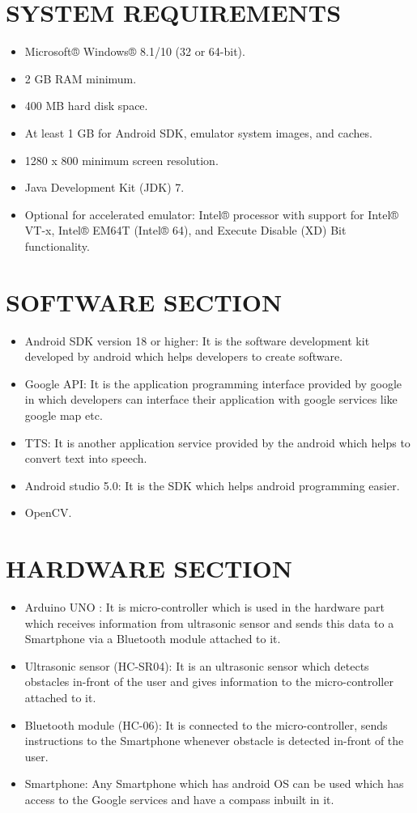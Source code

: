 \documentclass[10pt,a4paper,twoside]{report}
\begin{document}
\section{SYSTEM REQUIREMENTS}
\begin{itemize}
\item Microsoft® Windows® 8.1/10 (32 or 64-bit).
\item 2 GB RAM minimum.
\item 400 MB hard disk space.
\item At least 1 GB for Android SDK, emulator system images, and caches.
\item 1280 x 800 minimum screen resolution.
\item Java Development Kit (JDK) 7.
\item Optional for accelerated emulator: Intel® processor with support for Intel® VT-x, Intel® EM64T (Intel® 64), and Execute Disable (XD) Bit functionality.

\end{itemize}
\section{SOFTWARE SECTION}
\begin{itemize}
\item Android SDK version 18 or higher: It is the software development kit developed
by android which helps developers to create software.
\item Google API: It is the application programming interface provided by google in
which developers can interface their application with google services like google
map etc.
\item TTS: It is another application service provided by the android which helps to
convert text into speech.
\item Android studio 5.0: It is the SDK which helps android programming easier.
\item OpenCV.
\end{itemize}
\section{HARDWARE SECTION}
\begin{itemize}
\item Arduino UNO : It is micro-controller which is used in the hardware part which
receives information from ultrasonic sensor and sends this data to a Smartphone
via a Bluetooth module attached to it.
\item Ultrasonic sensor (HC-SR04): It is an ultrasonic sensor which detects obstacles
in-front of the user and gives information to the micro-controller attached to it.
\item Bluetooth module (HC-06): It is connected to the micro-controller, sends instructions
to the Smartphone whenever obstacle is detected in-front of the user.
\item Smartphone: Any Smartphone which has android OS can be used which has access
to the Google services and have a compass inbuilt in it.


\end{itemize}
\end{document}
